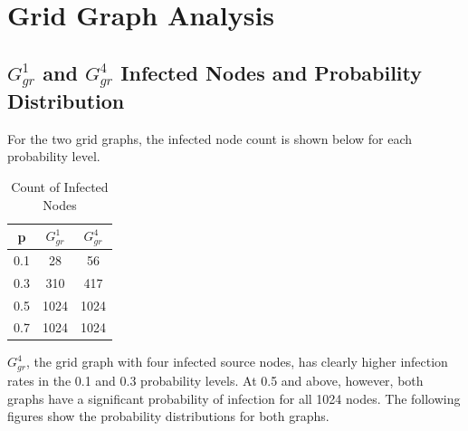 \documentclass[letterpaper,11pt]{article}
\begin{document}
\section{Grid Graph Analysis}
    \subsection{$G^{1}_{gr}$ and $G^{4}_{gr}$ Infected Nodes and Probability Distribution}

    For the two grid graphs, the infected node count is shown below for each 
    probability level.

    \begin{table}[htpb]
        \centering
        \caption{Count of Infected Nodes}
        \label{tab:infected_nodes}
        \begin{tabular}{c | c | c}
        p & $G^{1}_{gr}$ & $G^{4}_{gr}$ \\ 
        \hline
        0.1 & 28 & 56 \\ 
        0.3 & 310 & 417 \\ 
        0.5 & 1024 & 1024 \\
        0.7 & 1024 & 1024 \\
        \end{tabular}
    \end{table}

    $G^{4}_{gr}$, the grid graph with four infected source nodes, has clearly
    higher infection rates in the 0.1 and 0.3 probability levels. At 0.5 and 
    above, however, both graphs have a significant probability of infection for 
    all 1024 nodes. The following figures show the probability distributions 
    for both graphs.
\end{document}
